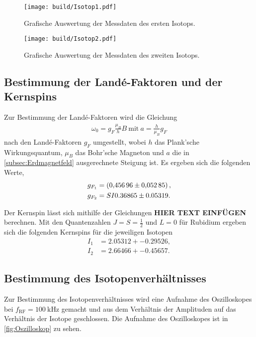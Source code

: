 \begin{figure}[H]
    \centering
    \texttt{[image: build/Isotop1.pdf]}
    \caption{Grafische Auswertung der Messdaten des ersten Isotops.}
    \label{fig:plot1}
\end{figure}

\begin{figure}[H]
    \centering
    \texttt{[image: build/Isotop2.pdf]}
    \caption{Grafische Auswertung der Messdaten des zweiten Isotops.}
    \label{fig:plot2}
\end{figure}

\subsection{Bestimmung der Landé-Faktoren und der Kernspins}
\label{subsec:lande}

Zur Bestimmung der Landé-Faktoren wird die Gleichung 
\begin{align}
    \omega_0=g_F\frac{\mu_B}{h}B\ \text{mit}\ a=\frac{h}{\mu_B}g_F
\end{align}
nach den Landé-Faktoren $g_F$ umgestellt, wobei $h$ das Plank'sche Wirkungsquantum, $\mu_B$ das Bohr'sche Magneton und $a$ die in \autoref{subsec:Erdmagnetfeld} ausgerechnete Steigung ist.
Es ergeben sich die folgenden Werte,
\begin{align*}
    g_{F_1} &= \SI{0.45696 \pm 0.05285}, \\
    g_{F_2} &= SI{0.36865 \pm 0.05319}.
\end{align*}

\noindent
Der Kernspin lässt sich mithilfe der Gleichungen \textbf{HIER TEXT EINFÜGEN} berechnen. Mit den Quantenzahlen $J=S=\frac 12$ und $L=0$ für Rubidium \cite{Anleitung21} ergeben sich die folgenden
Kernspins für die jeweiligen Isotopen
\begin{align*}
    I_1 &= \si{2.05312+-0.29526}, \\
    I_2 &= \si{2.66466+-0.45657}.
\end{align*}

\subsection{Bestimmung des Isotopenverhältnisses}
\label{subsec:isotopenverhaeltnis}

Zur Bestimmung des Isotopenverhältnisses wird eine Aufnahme des Oszilloskopes bei $f_{\text{RF}} = \SI{100}{\kilo\hertz}$ gemacht und aus dem Verhältnis der Amplituden auf das
Verhältnis der Isotope geschlossen. Die Aufnahme des Oszilloskopes ist in \autoref{fig:Oszilloskop} zu sehen.

